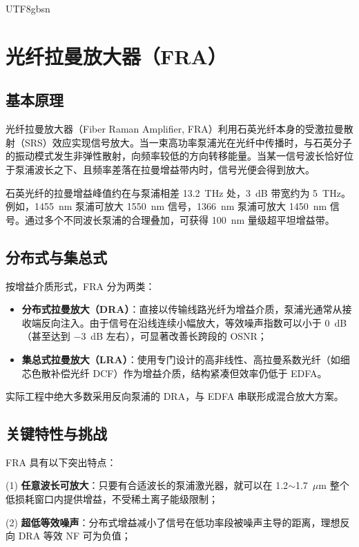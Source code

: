\documentclass[11pt,a4paper]{article}
\begin{document}
\begin{CJK}{UTF8}{gbsn}
\section{光纤拉曼放大器（FRA）}

\subsection{基本原理}

光纤拉曼放大器（Fiber Raman Amplifier, FRA）利用石英光纤本身的受激拉曼散射（SRS）效应实现信号放大\cite{islam2002}。当一束高功率泵浦光在光纤中传播时，与石英分子的振动模式发生非弹性散射，向频率较低的方向转移能量。当某一信号波长恰好位于泵浦波长之下、且频率差落在拉曼增益带内时，信号光便会得到放大。

石英光纤的拉曼增益峰值约在与泵浦相差 13.2~THz 处，3~dB 带宽约为 5~THz。例如，1455~nm 泵浦可放大 1550~nm 信号，1366~nm 泵浦可放大 1450~nm 信号。通过多个不同波长泵浦的合理叠加，可获得 100~nm 量级超平坦增益带\cite{bromage2004}。

\subsection{分布式与集总式}

按增益介质形式，FRA 分为两类：

\begin{itemize}[leftmargin=2.5em,itemsep=2pt]
\item \textbf{分布式拉曼放大（DRA）}：直接以传输线路光纤为增益介质，泵浦光通常从接收端反向注入。由于信号在沿线连续小幅放大，等效噪声指数可以小于 0~dB（甚至达到 $-3$~dB 左右），可显著改善长跨段的 OSNR；
\item \textbf{集总式拉曼放大（LRA）}：使用专门设计的高非线性、高拉曼系数光纤（如细芯色散补偿光纤 DCF）作为增益介质，结构紧凑但效率仍低于 EDFA。
\end{itemize}

实际工程中绝大多数采用反向泵浦的 DRA，与 EDFA 串联形成混合放大方案。

\subsection{关键特性与挑战}

FRA 具有以下突出特点\cite{headley2005}：

(1) \textbf{任意波长可放大}：只要有合适波长的泵浦激光器，就可以在 1.2$\sim$1.7~$\mu$m 整个低损耗窗口内提供增益，不受稀土离子能级限制；

(2) \textbf{超低等效噪声}：分布式增益减小了信号在低功率段被噪声主导的距离，理想反向 DRA 等效 NF 可为负值；


\end{CJK}
\end{document}
